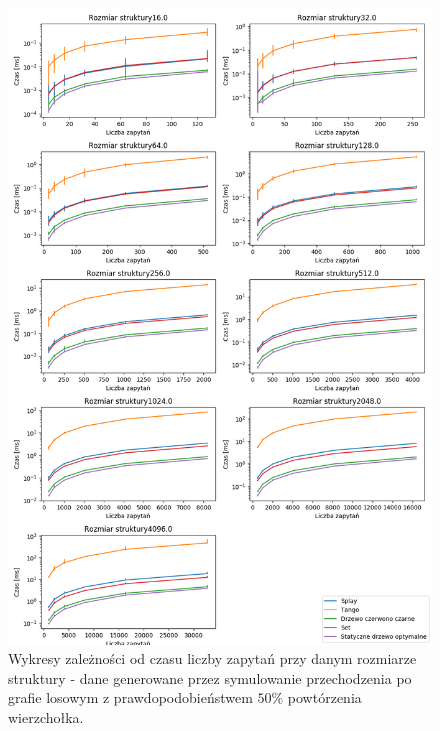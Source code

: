 \documentclass[declaration,shortabstract]{iithesis}
\theoremstyle{thm}
\theoremstyle{remark}
\theoremstyle{plain}
\theoremstyle{plain}
\theoremstyle{plain}
\begin{document}
\begin{figure}[H]  
\centering
    \includegraphics[scale=0.5]{wykresy/randwalk50.png}
      \caption{Wykresy zależności od czasu liczby zapytań przy danym rozmiarze struktury - dane generowane przez symulowanie przechodzenia po grafie losowym z prawdopodobieństwem  \(50\%\) powtórzenia wierzchołka. }  
    \label{fig:zigzig} 
\end{figure}
\end{document}
